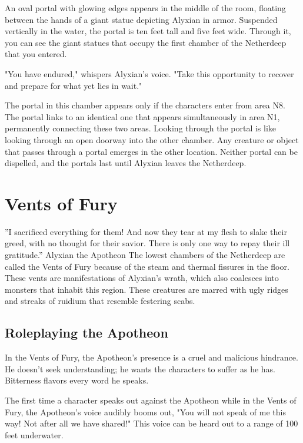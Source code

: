\documentclass[10pt,a4paper,twoside,fancy,bg=print,twocolumn,openany,nodeprecatedcode]{dndbook}
\begin{document}
\begin{DndReadAloud}{}
An oval portal with glowing edges appears in the middle of the room, floating between the hands of a giant statue depicting Alyxian in armor. Suspended vertically in the water, the portal is ten feet tall and five feet wide. Through it, you can see the giant statues that occupy the first chamber of the Netherdeep that you entered.

"You have endured," whispers Alyxian's voice. "Take this opportunity to recover and prepare for what yet lies in wait."

\end{DndReadAloud}

The portal in this chamber appears only if the characters enter from area N8. The portal links to an identical one that appears simultaneously in area N1, permanently connecting these two areas. Looking through the portal is like looking through an open doorway into the other chamber. Any creature or object that passes through a portal emerges in the other location. Neither portal can be dispelled, and the portals last until Alyxian leaves the Netherdeep.

\section{Vents of Fury}
\DndQuote%
{}
{''I sacrificed everything for them! And now they tear at my flesh to slake their greed, with no thought for their savior. There is only one way to repay their ill gratitude.''}
{Alyxian the Apotheon}
The lowest chambers of the Netherdeep are called the Vents of Fury because of the steam and thermal fissures in the floor. These vents are manifestations of Alyxian's wrath, which also coalesces into monsters that inhabit this region. These creatures are marred with ugly ridges and streaks of ruidium that resemble festering scabs.

\subsection{Roleplaying the Apotheon}
In the Vents of Fury, the Apotheon's presence is a cruel and malicious hindrance. He doesn't seek understanding; he wants the characters to suffer as he has. Bitterness flavors every word he speaks.

The first time a character speaks out against the Apotheon while in the Vents of Fury, the Apotheon's voice audibly booms out, "You will not speak of me this way! Not after all we have shared!" This voice can be heard out to a range of 100 feet underwater.
\end{document}
